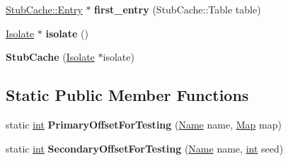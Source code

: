 \begin{DoxyCompactItemize}
\item 
\mbox{\label{classv8_1_1internal_1_1StubCache_aab4c138ee8789856c0a67058107a9c58}} 
\mbox{\hyperlink{structv8_1_1internal_1_1StubCache_1_1Entry}{Stub\+Cache\+::\+Entry}} $\ast$ {\bfseries first\+\_\+entry} (Stub\+Cache\+::\+Table table)
\item 
\mbox{\label{classv8_1_1internal_1_1StubCache_a09849599e472fa634b681bc3c2aef9af}} 
\mbox{\hyperlink{classv8_1_1internal_1_1Isolate}{Isolate}} $\ast$ {\bfseries isolate} ()
\item 
\mbox{\label{classv8_1_1internal_1_1StubCache_a3da7a5deaea1235ff591685f3314ea9e}} 
{\bfseries Stub\+Cache} (\mbox{\hyperlink{classv8_1_1internal_1_1Isolate}{Isolate}} $\ast$isolate)
\end{DoxyCompactItemize}
\subsection*{Static Public Member Functions}
\begin{DoxyCompactItemize}
\item 
\mbox{\label{classv8_1_1internal_1_1StubCache_aeebd9314dc3ee8996a0d19d573580698}} 
static \mbox{\hyperlink{classint}{int}} {\bfseries Primary\+Offset\+For\+Testing} (\mbox{\hyperlink{classv8_1_1internal_1_1Name}{Name}} name, \mbox{\hyperlink{classv8_1_1internal_1_1Map}{Map}} map)
\item 
\mbox{\label{classv8_1_1internal_1_1StubCache_a53e5ff1d18762fa44df10fe6004a8010}} 
static \mbox{\hyperlink{classint}{int}} {\bfseries Secondary\+Offset\+For\+Testing} (\mbox{\hyperlink{classv8_1_1internal_1_1Name}{Name}} name, \mbox{\hyperlink{classint}{int}} seed)
\end{DoxyCompactItemize}
